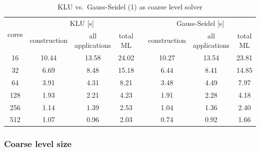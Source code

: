 \begin{table}[ht]
  \begin{center}
    \begin{tabular}{cccccccc}
      \hline
      \multirow{2}{*}{cores} & \multicolumn{3}{c}{KLU [s]} & &
      \multicolumn{3}{c}{Gauss-Seidel [s]} \\
      \cline{2-4} \cline{6-8}
      &  construction & all applications & total ML & & construction & all
      applications & total ML\\
      \hline
      16  & 10.44 & 13.58 & 24.02 & & 10.27 & 13.54 & 23.81 \\
      32  & 6.69 & 8.48 & 15.18 & & 6.44 & 8.41 & 14.85 \\
      64  & 3.91 & 4.31 & 8.21 & & 3.48 & 4.49 & 7.97 \\
      128 & 1.93 & 2.21 & 4.23 & & 1.91 & 2.28 & 4.18 \\
      256 & 1.14 & 1.39 & 2.53 & & 1.04 & 1.36 & 2.40 \\
      512 & 1.07 & 0.96 & 2.03 & & 0.74 & 0.92 & 1.66 \\
      \hline
    \end{tabular}
    \caption{KLU vs.\ Gauss-Seidel (1) as coarse level
    solver}\label{tab:gs_vs_klu} \end{center}
\end{table}

\subsubsection*{Coarse level size}

